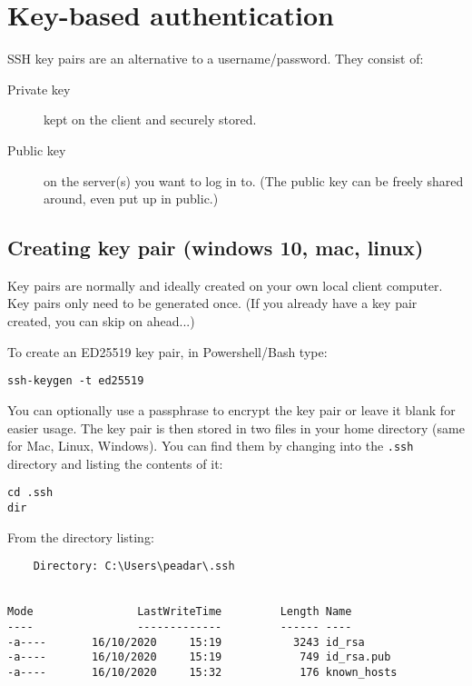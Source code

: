 \section{Key-based authentication}
\label{key-based-authentication}

SSH key pairs are an alternative to a username/password. They consist
of:

\begin{description}
\item[Private key]
kept on the client and securely stored.
\item[Public key]
on the server(s) you want to log in to. (The public key can be freely
shared around, even put up in public.)
\end{description}

\subsection{Creating key pair (windows 10, mac, linux)}
\label{sec:creating-key-pair}

Key pairs are normally and ideally created on your own local client computer.
Key pairs only need to be generated once.
(If you already have a key pair created, you can skip on ahead...)

To create an ED25519 key pair, in Powershell/Bash type:

\begin{verbatim}
ssh-keygen -t ed25519
\end{verbatim}

You can optionally use a passphrase to encrypt the key pair or leave it blank for easier usage.
The key pair is then stored in two files in your home directory (same for Mac, Linux, Windows).
You can find them by changing into the \texttt{.ssh} directory and listing the contents of it:

\begin{verbatim}
cd .ssh
dir
\end{verbatim}

From the directory listing:

\begin{verbatim}
    Directory: C:\Users\peadar\.ssh


Mode                LastWriteTime         Length Name
----                -------------         ------ ----
-a----       16/10/2020     15:19           3243 id_rsa
-a----       16/10/2020     15:19            749 id_rsa.pub
-a----       16/10/2020     15:32            176 known_hosts
\end{verbatim}

